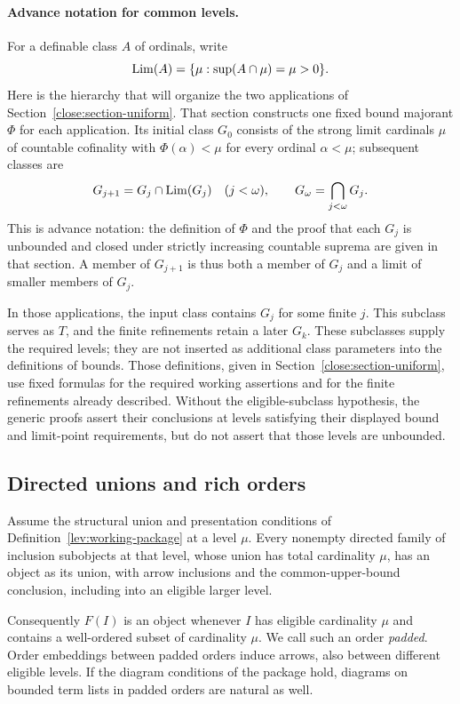 \paragraph{Advance notation for common levels.}
\label{lev:closure-preview}
For a definable class $A$ of ordinals, write
\[
 \operatorname{Lim}(A)=\{\mu:\sup(A\cap\mu)=\mu>0\}.
\]
Here is the hierarchy that will organize the two applications of
Section~\ref{close:section-uniform}.  That section constructs one fixed
bound majorant $\Phi$ for each application.  Its initial class $G_0$
consists of the strong limit cardinals $\mu$ of countable cofinality with
$\Phi(\alpha)<\mu$ for every ordinal $\alpha<\mu$; subsequent classes are
\[
 G_{j+1}=G_j\cap\operatorname{Lim}(G_j)\quad(j<\omega),
 \qquad G_\omega=\bigcap_{j<\omega}G_j.
\]
This is advance notation: the definition of $\Phi$ and the proof that
each $G_j$ is unbounded and closed under strictly increasing countable
suprema are given in that section.  A member of $G_{j+1}$ is thus both
a member of $G_j$ and a limit of smaller members of $G_j$.

In those applications, the input class contains $G_j$ for some finite
$j$.  This subclass serves as $T$, and the finite refinements retain a
later $G_k$.  These subclasses supply the required levels; they are not inserted as
additional class parameters into the definitions of bounds. Those
definitions, given in Section~\ref{close:section-uniform}, use fixed
formulas for the required working assertions and for the finite
refinements already described.  Without the eligible-subclass hypothesis, the generic
proofs assert their conclusions at levels satisfying their displayed
bound and limit-point requirements, but do not assert that those
levels are unbounded.

\subsection{Directed unions and rich orders}

\begin{lemma}
\label{lev:directed-unions}
Assume the structural union and presentation conditions of
Definition~\ref{lev:working-package} at a level $\mu$.
Every nonempty directed family of inclusion subobjects at that level,
whose union has total cardinality $\mu$, has an object as its union,
with arrow inclusions and the common-upper-bound conclusion, including
into an eligible larger level.

Consequently $F(I)$ is an object whenever $I$ has eligible cardinality
$\mu$ and contains a well-ordered subset of cardinality $\mu$.
We call such an order \emph{padded}.  Order embeddings between padded
orders induce arrows, also between different eligible levels.
If the diagram conditions of the package hold, diagrams on bounded
term lists in padded orders are natural as well.
\end{lemma}

